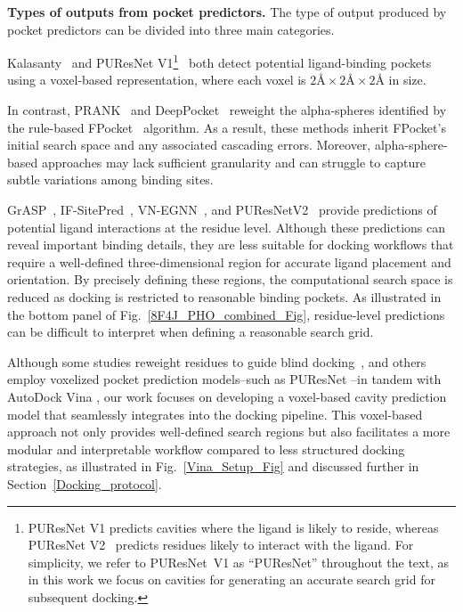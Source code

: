 \documentclass[10pt,conference]{IEEEtran}
\begin{document}
\vspace{1em}
\noindent
\textbf{Types of outputs from pocket predictors.}
The type of output produced by pocket predictors can be divided into three main categories. 

Kalasanty~\cite{stepniewska2020improving} and PUResNet V1\footnote{PUResNet V1\cite{kandel2021puresnet} predicts cavities where the ligand is likely to reside, whereas PUResNet V2~\cite{jeevan2024puresnetv2} predicts residues likely to interact with the ligand. For simplicity, we refer to PUResNet~V1 as ``PUResNet'' throughout the text, as in this work we focus on cavities for generating an accurate search grid for subsequent docking.}~\cite{kandel2021puresnet} both detect potential ligand-binding pockets using a voxel-based representation, where each voxel is $2\text{\AA} \times 2\text{\AA} \times 2\text{\AA}$ in size.

In contrast, PRANK~\cite{krivak2015improving} and DeepPocket~\cite{aggarwal2021deeppocket} reweight the alpha-spheres identified by the rule-based FPocket~\cite{le2009fpocket} algorithm. As a result, these methods inherit FPocket's initial search space and any associated cascading errors. Moreover, alpha-sphere-based approaches may lack sufficient granularity and can struggle to capture subtle variations among binding sites.

GrASP~\cite{smith2024graph}, IF-SitePred~\cite{carbery2024learnt}, VN-EGNN~\cite{sestak2024vn_egnn}, and PUResNetV2~\cite{jeevan2024puresnetv2} provide predictions of potential ligand interactions at the residue level. Although these predictions can reveal important binding details, they are less suitable for docking workflows that require a well-defined three-dimensional region for accurate ligand placement and orientation. By precisely defining these regions, the computational search space is reduced as docking is restricted to reasonable binding pockets. As illustrated in the bottom panel of Fig.~\ref{8F4J_PHO_combined_Fig}, residue-level predictions can be difficult to interpret when defining a reasonable search grid.


Although some studies reweight residues to guide blind docking~\cite{shen2024pgbind}, and others~\cite{huang2023dsdp} employ voxelized pocket prediction models--such as PUResNet \cite{kandel2021puresnet}--in tandem with AutoDock Vina \cite{eberhardt2021autodock}, our work focuses on developing a voxel-based cavity prediction model that seamlessly integrates into the docking pipeline. This voxel-based approach not only provides well-defined search regions but also facilitates a more modular and interpretable workflow compared to less structured docking strategies, as illustrated in Fig.~\ref{Vina_Setup_Fig} and discussed further in Section~\ref{Docking_protocol}. 
\end{document}
